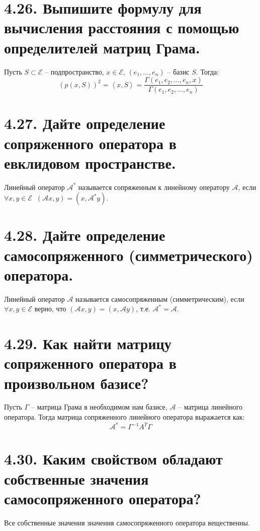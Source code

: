 \documentclass{article}
\begin{document}
\section*{\LARGE 4.26. Выпишите формулу для вычисления расстояния с помощью определителей матриц Грама.}
Пусть $S \subset \mathcal{E}$ -- подпространство, $x \in \mathcal{E},\, (e_1, ... , e_n)$ -- базис $S$. Тогда:
$$
(p(x, S))^2 = \left<x,S\right> = \frac{\Gamma(e_1, e_2, ... , e_n, x)}{\Gamma(e_1, e_2, ... , e_n)}
$$

\section*{\LARGE 4.27. Дайте определение сопряженного оператора в евклидовом пространстве.}
Линейный оператор $\mathcal{A}^*$ называется сопряженным к линейному оператору $\mathcal{A}$, если $\forall x, y \in \mathcal{E} \;\; (\mathcal{A} x, y) = (x, \mathcal{A}^* y)$.

\section*{\LARGE 4.28. Дайте определение самосопряженного (симметрического) оператора.}
Линейный оператор $\mathcal{A}$ называется самосопряженным (симметрическим), если $\forall x, y \in \mathcal{E}$ верно, что $(\mathcal{A}x, y) = (x, \mathcal{A}y)$, т.е. $\mathcal{A}^* = \mathcal{A}$.

\section*{\LARGE 4.29. Как найти матрицу сопряженного оператора в произвольном базисе?}
Пусть $\Gamma$ -- матрица Грама в необходимом нам базисе, $\mathcal{A}$ -- матрица линейного оператора. Тогда матрица сопряженного линейного оператора выражается как:
$$
\mathcal{A}^* = \Gamma^{-1}A^T\Gamma
$$

\section*{\LARGE 4.30. Каким свойством обладают собственные значения самосопряженного оператора?}
Все собственные значения значения самосопряженного оператора вещественны.
\end{document}
